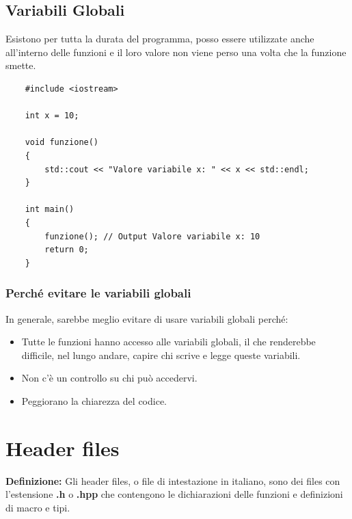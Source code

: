 \subsection{Variabili Globali}

\textsf{\small Esistono per tutta la durata del programma, posso essere utilizzate anche all'interno delle funzioni e il loro valore non viene perso una volta che la funzione smette.} \\

\begin{lstlisting}
	#include <iostream>
	
	int x = 10;
	
	void funzione()
	{
		std::cout << "Valore variabile x: " << x << std::endl;
	}
	
	int main()
	{
		funzione(); // Output Valore variabile x: 10
		return 0;
	}
\end{lstlisting}

\subsubsection{Perché evitare le variabili globali}

\textsf{\small In generale, sarebbe meglio evitare di usare variabili globali perché: } \\

\begin{itemize}
	\item \textsf{\small Tutte le funzioni hanno accesso alle variabili globali, il che renderebbe difficile, nel lungo andare, capire chi scrive e legge queste variabili.}
	\item \textsf{\small Non c'è un controllo su chi può accedervi.}
	\item \textsf{\small Peggiorano la chiarezza del codice.}
\end{itemize}


\newpage

\section{Header files}

\textsf{\small \textbf{Definizione: } Gli header files, o file di intestazione in italiano, sono dei files con l'estensione \textbf{.h} o \textbf{.hpp} che contengono le dichiarazioni delle funzioni e definizioni di macro e tipi.}\\

